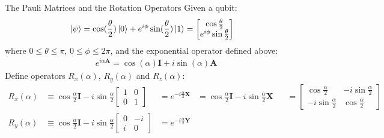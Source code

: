 \documentclass{beamer}
\begin{document}
\begin{frame}{The Pauli Matrices and the Rotation Operators\tiny\cite{rotationsonblochsphere}}
  {\tiny
    Given a qubit:
    \begin{align*}
      \ket{\psi} = \cos(\frac{\theta}2)\ket{0}+e^{i\phi}\sin(\frac{\theta}2)\ket{1} &= \begin{bmatrix}\cos{\frac{\theta}2} \\ e^{i\phi}\sin{\frac{\theta}2} \end{bmatrix}
    \end{align*}
    where $0\leqslant\theta\leqslant\pi$, $0\leqslant\phi\leqslant2\pi$, and the exponential operator defined above:
    \begin{align*}
      e^{i\alpha\mathbf{A}} = \cos(\alpha)\mathbf{I} + i\sin(\alpha)\mathbf{A}
    \end{align*}
    Define operators $R_x(\alpha)$, $R_y(\alpha)$ and $R_z(\alpha)$:
    \begin{align*}
      R_x(\alpha) &\equiv \cos\frac{\alpha}2\mathbf{I} - i\sin\frac{\alpha}2
                                                                     \begin{bmatrix}
                                                                       1 & 0 \\
                                                                       0 & 1
                                                                     \end{bmatrix}
                  &= e^{-i\frac{\alpha}2\mathbf{X}}
                  &= \cos\frac{\alpha}2\mathbf{I} - i\sin\frac{\alpha}2 \mathbf{X}
                  &&=\begin{bmatrix}
                    \cos\frac{\alpha}2 & -i\sin\frac{\alpha}2 \\
                    -i\sin\frac{\alpha}2 & \cos\frac{\alpha}2
                    \end{bmatrix} \\
      R_y(\alpha) &\equiv \cos\frac{\alpha}2\mathbf{I} - i\sin\frac{\alpha}2
                                                                     \begin{bmatrix}
                                                                       0 & -i \\
                                                                       i & 0
                                                                     \end{bmatrix}
                  &= e^{-i\frac{\alpha}2\mathbf{Y}}

\end{align*}}
\end{frame}
\end{document}
